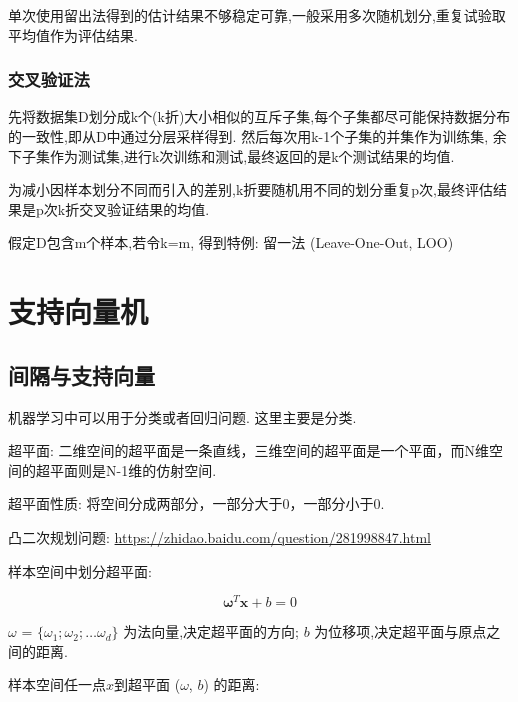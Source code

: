 \documentclass[12pt]{article}
\numberwithin{equation}{section}%
\begin{document}
单次使用留出法得到的估计结果不够稳定可靠,一般采用多次随机划分,重复试验取平均值作为评估结果.

\subsubsection{交叉验证法}

先将数据集D划分成k个(k折)大小相似的互斥子集,每个子集都尽可能保持数据分布的一致性,即从D中通过分层采样得到. 然后每次用k-1个子集的并集作为训练集, 余下子集作为测试集,进行k次训练和测试,最终返回的是k个测试结果的均值.

为减小因样本划分不同而引入的差别,k折要随机用不同的划分重复p次,最终评估结果是p次k折交叉验证结果的均值.

假定D包含m个样本,若令k=m, 得到特例: 留一法 (Leave-One-Out, LOO)









\section{支持向量机}

\subsection{间隔与支持向量}

机器学习中可以用于分类或者回归问题. 这里主要是分类.

超平面: 二维空间的超平面是一条直线，三维空间的超平面是一个平面，而N维空间的超平面则是N-1维的仿射空间.

超平面性质: 将空间分成两部分，一部分大于0，一部分小于0.

凸二次规划问题: \url{https://zhidao.baidu.com/question/281998847.html}

样本空间中划分超平面:

\begin{equation}
\boldsymbol{\omega}^{T}\boldsymbol{x}+b=0
\end{equation}

\boldmath$\omega$  \unboldmath = $\{\omega_{1};\omega_{2};\ldots \omega_{d}\}$ 为法向量,决定超平面的方向; $b$ 为位移项,决定超平面与原点之间的距离.

样本空间任一点\boldmath$x$到超平面 \boldmath($\omega$, \unboldmath$b$) 的距离:
\end{document}

